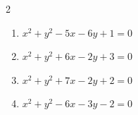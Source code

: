 \begin{multicols}{2}
\begin{enumerate}

  \item $x^{2}+y^{2}-5x-6y+1=0$


  \item $x^{2}+y^{2}+6x-2y+3=0$


  \item $x^{2}+y^{2}+7x-2y+2=0$


  \item $x^{2}+y^{2}-6x-3y-2=0$


\end{enumerate}
\end{multicols}

\newpage
\resetdrill


